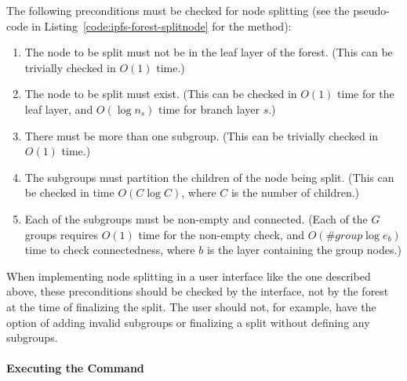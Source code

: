 The following preconditions must be checked for node splitting (see the pseudo-code in Listing~\ref{code:ipfs-forest-splitnode} for the method):
%
\begin{enumerate}

\item The node to be split must not be in the leaf layer of the forest. (This can be trivially checked in $O(1)$ time.)
\item The node to be split must exist. (This can be checked in $O(1)$ time for the leaf layer, and $O(\log n_s)$ time for branch layer $s$.)
\item There must be more than one subgroup. (This can be trivially checked in $O(1)$ time.)
\item The subgroups must partition the children of the node being split. (This can be checked in time $O(C \log C)$, where $C$ is the number of children.)
\item Each of the subgroups must be non-empty and connected. (Each of the $G$ groups requires $O(1)$ time for the non-empty check, and $O(\#\mathit{group} \log e_b)$ time to check connectedness, where $b$ is the layer containing the group nodes.)

\end{enumerate}
%
When implementing node splitting in a user interface like the one described above, these preconditions should be checked by the interface, not by the forest at the time of finalizing the split. The user should not, for example, have the option of adding invalid subgroups or finalizing a split without defining any subgroups.

\paragraph{Executing the Command}

